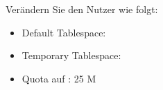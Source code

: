    \item Verändern Sie den Nutzer  wie folgt:
    \begin{itemize}
      \item Default Tablespace: 
      \item Temporary Tablespace: 
      \item Quota auf : 25 M
    \end{itemize}
